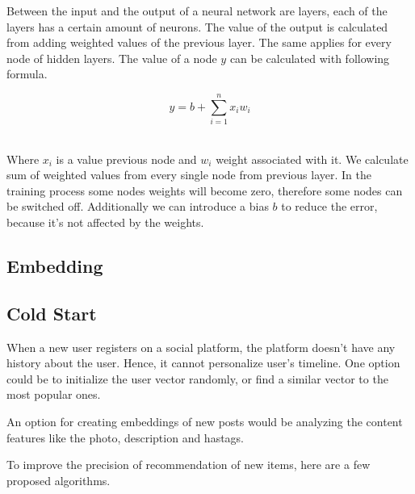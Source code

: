 Between the input and the output of a neural network are layers, each of the layers has a certain amount of neurons. \cite{GAO2020409} The value of the output is calculated from adding weighted values of the previous layer. The same applies for every node of hidden layers. The value of a node $y$ can be calculated with following formula. \cite{9784987} 

\[ y = b + \sum_{i=1}^{n} x_i w_i  \]\

Where $x_i$ is a value previous node and $w_i$ weight associated with it. We calculate sum of weighted values from every single node from previous layer. In the training process some nodes weights will become zero, therefore some nodes can be switched off. Additionally we can introduce a bias $b$ to reduce the error, because it's not affected by the weights. 

\subsection{Embedding}

\subsection{Cold Start}\label{cold-start}

When a new user registers on a social platform, the platform doesn't have any history about the user. Hence, it cannot personalize user's timeline. One option could be to initialize the user vector randomly, or find a similar vector to the most popular ones.

An option for creating embeddings of new posts would be analyzing the content features like the photo, description and hastags.

To improve the precision of recommendation of new items, here are a few proposed algorithms. 

